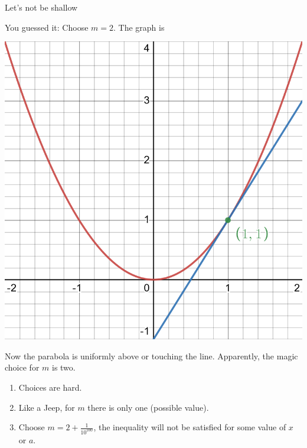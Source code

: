 \documentclass[usenames,dvipsnames,fleqn,leqno,10pt, pdflatex]{beamer}
\newenvironment{PenList}{
  \begin{enumerate}[\textcolor{UNK-blue}{\PencilRightDown}]
    \addtolength{\itemsep}{-0.0\itemsep}}
  {\end{enumerate}}
\begin{document}
\begin{frame}{Let's not be shallow}

You guessed it: Choose $m=2$. The graph is 

  \begin{center}
\includegraphics[scale=0.125]{desmos-graph(9).png}

\end{center}

Now the parabola is uniformly above or touching the line. Apparently, the magic choice for $m$ is two.

\begin{PenList}
\item Choices are hard. 

\item Like a Jeep, for $m$ there is only one (possible value).

\item Choose $m = 2 + \frac{1}{10^{100}}$, the inequality will not be satisfied for some
value of $x$ or $a$.

\end{PenList}
\end{frame}
\end{document}
